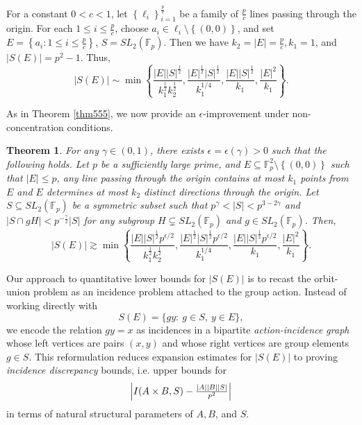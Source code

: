\documentclass[11pt]{article}
\newtheorem{theorem}{Theorem}[section]
\def\Fbb{\mathbb{F}}
\def\SL{SL}
\def\l({\left(}
\def\r){\right)}
\def\lv{\left\vert}
\def\rv{\right\vert}
\def\lo{\left\{}
\def\ro{\right\}}
\begin{document}
For a constant $0<c<1$, let $\lo \ell_i \ro_{i=1}^{\frac{p}{c}}$ be a family of $\frac{p}{c}$ lines passing through the origin. For each $1\le i \le \frac{p}{c}$, choose $a_i \in \ell_i \setminus \lo (0,0) \ro$, and set $E = \lo a_i \colon 1 \le i \le \frac{p}{c} \ro$, $S = \SL_2(\Fbb_p)$. Then we have $k_2=|E|=\frac{p}{c} ,k_1=1$, and $|S(E)|=p^2-1$. 
    Thus, 
     \[ \lv S(E)\rv \sim  \min \lo  \frac{\lv E\rv \lv S\rv^{\frac{1}{2}}}{k_1^{\frac{1}{2}}k_2^{\frac{1}{2}}}, \frac{\lv E\rv^{\frac{1}{2}} \lv S\rv^{\frac{1}{2}}}{k_1^{1/4}}, \frac{\lv E\rv \lv S\rv^{\frac{1}{2}}}{k_1}, \frac{\lv E\rv^2}{k_1} \ro .\]

As in Theorem \ref{thm555}, we now provide an $\epsilon$-improvement under non-concentration conditions.

\begin{theorem}\label{thm3'}
For any $\gamma\in (0, 1)$, there exists $\epsilon=\epsilon(\gamma)>0$ such that the following holds. 
  Let $p$ be a sufficiently large prime, and $E \subseteq \Fbb_p^2\setminus \lo (0, 0)\ro$ such that $|E| \le p$, any line passing through the origin contains at most $k_1$ points from $E$ and $E$ determines at most $k_2$ distinct directions through the origin. Let $S \subseteq \SL_2 \l( \Fbb_p \r)$ be a symmetric subset such that $p^{\gamma} < \lv S\rv < p^{3-2\gamma} $ and $\lv S \cap gH\rv < p^{-\frac{\gamma}{2}} \lv S\rv $ for any subgroup $H \subsetneq \SL_2 \l( \Fbb_p \r)$ and $g \in \SL_2 \l( \Fbb_p \r)$. Then,
  \[ \lv S(E)\rv \gtrsim \min \lo  \frac{\lv E\rv \lv S\rv^{\frac{1}{2}}p^{\epsilon /2}}{k_1^{\frac{1}{2}}k_2^{\frac{1}{2}}}, \frac{\lv E\rv^{\frac{1}{2}} \lv S\rv^{\frac{1}{2}}p^{\epsilon /2}}{k_1^{1/4}}, \frac{\lv E\rv \lv S\rv^{\frac{1}{2}}p^{\epsilon /2}}{k_1}, \frac{\lv E\rv^2}{k_1} \ro .\]
\end{theorem}

Our approach to quantitative lower bounds for $|S(E)|$ is to recast the orbit-union problem as an incidence problem attached to the group action.
Instead of working directly with
\[
S(E)=\{gy:\ g\in S,\ y\in E\},
\]
we encode the relation $gy=x$ as incidences in a bipartite \emph{action-incidence graph} whose left vertices are pairs $(x,y)$ and whose right vertices are group elements $g\in S$.
This reformulation reduces expansion estimates for $|S(E)|$ to proving \emph{incidence discrepancy} bounds, i.e. upper bounds for
\[
\Bigl|I(A\times B,S)-\tfrac{|A||B||S|}{p^{2}}\Bigr|
\]
in terms of natural structural parameters of $A,B$, and $S$.
\end{document}
